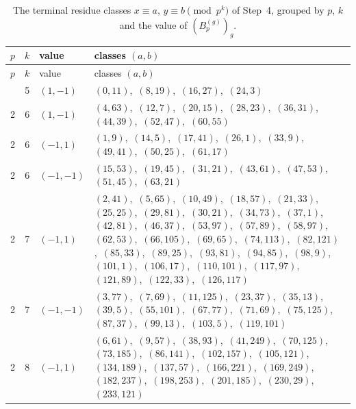 \documentclass[11pt]{article}
\begin{document}
\begingroup\small
\setlength{\LTcapwidth}{\textwidth}
\begin{longtable}{@{}rrl>{\raggedright\arraybackslash}p{}@{}}
\caption{The terminal residue classes $x\equiv a$, $y\equiv b\pmod{p^k}$ of Step~4, grouped by $p$, $k$ and the value of $(B^{(g)}_p)_g$.}\label{tab:local}\\
\hline $p$ & $k$ & value & classes $(a,b)$\\\hline\endfirsthead
\hline $p$ & $k$ & value & classes $(a,b)$\\\hline\endhead\hline\endfoot
2 & 5 & $(1,-1)$ & $(0,11)$,\allowbreak\ $(8,19)$,\allowbreak\ $(16,27)$,\allowbreak\ $(24,3)$\\
2 & 6 & $(1,-1)$ & $(4,63)$,\allowbreak\ $(12,7)$,\allowbreak\ $(20,15)$,\allowbreak\ $(28,23)$,\allowbreak\ $(36,31)$,\allowbreak\ $(44,39)$,\allowbreak\ $(52,47)$,\allowbreak\ $(60,55)$\\
2 & 6 & $(-1,1)$ & $(1,9)$,\allowbreak\ $(14,5)$,\allowbreak\ $(17,41)$,\allowbreak\ $(26,1)$,\allowbreak\ $(33,9)$,\allowbreak\ $(49,41)$,\allowbreak\ $(50,25)$,\allowbreak\ $(61,17)$\\
2 & 6 & $(-1,-1)$ & $(15,53)$,\allowbreak\ $(19,45)$,\allowbreak\ $(31,21)$,\allowbreak\ $(43,61)$,\allowbreak\ $(47,53)$,\allowbreak\ $(51,45)$,\allowbreak\ $(63,21)$\\
2 & 7 & $(-1,1)$ & $(2,41)$,\allowbreak\ $(5,65)$,\allowbreak\ $(10,49)$,\allowbreak\ $(18,57)$,\allowbreak\ $(21,33)$,\allowbreak\ $(25,25)$,\allowbreak\ $(29,81)$,\allowbreak\ $(30,21)$,\allowbreak\ $(34,73)$,\allowbreak\ $(37,1)$,\allowbreak\ $(42,81)$,\allowbreak\ $(46,37)$,\allowbreak\ $(53,97)$,\allowbreak\ $(57,89)$,\allowbreak\ $(58,97)$,\allowbreak\ $(62,53)$,\allowbreak\ $(66,105)$,\allowbreak\ $(69,65)$,\allowbreak\ $(74,113)$,\allowbreak\ $(82,121)$,\allowbreak\ $(85,33)$,\allowbreak\ $(89,25)$,\allowbreak\ $(93,81)$,\allowbreak\ $(94,85)$,\allowbreak\ $(98,9)$,\allowbreak\ $(101,1)$,\allowbreak\ $(106,17)$,\allowbreak\ $(110,101)$,\allowbreak\ $(117,97)$,\allowbreak\ $(121,89)$,\allowbreak\ $(122,33)$,\allowbreak\ $(126,117)$\\
2 & 7 & $(-1,-1)$ & $(3,77)$,\allowbreak\ $(7,69)$,\allowbreak\ $(11,125)$,\allowbreak\ $(23,37)$,\allowbreak\ $(35,13)$,\allowbreak\ $(39,5)$,\allowbreak\ $(55,101)$,\allowbreak\ $(67,77)$,\allowbreak\ $(71,69)$,\allowbreak\ $(75,125)$,\allowbreak\ $(87,37)$,\allowbreak\ $(99,13)$,\allowbreak\ $(103,5)$,\allowbreak\ $(119,101)$\\
2 & 8 & $(-1,1)$ & $(6,61)$,\allowbreak\ $(9,57)$,\allowbreak\ $(38,93)$,\allowbreak\ $(41,249)$,\allowbreak\ $(70,125)$,\allowbreak\ $(73,185)$,\allowbreak\ $(86,141)$,\allowbreak\ $(102,157)$,\allowbreak\ $(105,121)$,\allowbreak\ $(134,189)$,\allowbreak\ $(137,57)$,\allowbreak\ $(166,221)$,\allowbreak\ $(169,249)$,\allowbreak\ $(182,237)$,\allowbreak\ $(198,253)$,\allowbreak\ $(201,185)$,\allowbreak\ $(230,29)$,\allowbreak\ $(233,121)$\\

\end{longtable}
\end{document}
